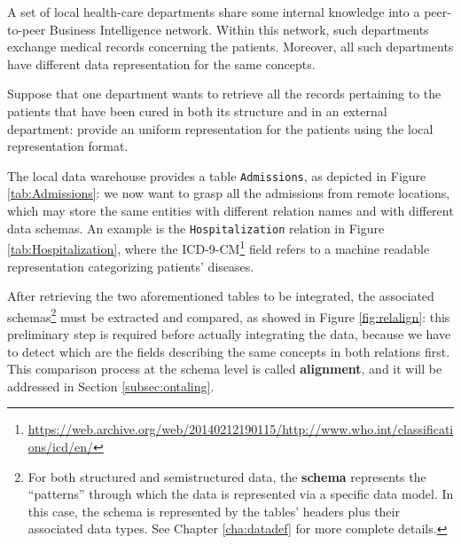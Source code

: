 \begin{example}[label=ex:firstThesis]
A  set of local health-care departments share some internal knowledge into a peer-to-peer Business Intelligence network. Within this network, such departments exchange medical records concerning the patients. Moreover, all such departments have different data representation for the same concepts.

Suppose that one department wants to retrieve all the records pertaining to the patients that have been cured in both its structure and in an external department: provide an uniform representation for the patients using the local representation format.

The local data warehouse provides a table \texttt{Admissions}, as depicted in Figure \ref{tab:Admissions}: we now want to grasp all the admissions from remote locations, which may store the same entities with different relation names and with different data schemas. An example is the \texttt{Hospitalization} relation in Figure \ref{tab:Hospitalization}, where the ICD-9-CM\footnote{\url{https://web.archive.org/web/20140212190115/http://www.who.int/classifications/icd/en/}} field refers to a machine readable representation categorizing patients' diseases.
\end{example}



After retrieving the two aforementioned tables to be integrated, the associated schemas\footnote{For both structured and semistructured data, the \textbf{schema} represents the ``patterns'' through which the data is represented via a specific data model. In this case, the schema is represented by the tables' headers plus their associated data types. See Chapter \ref{cha:datadef} for more complete details.} must be extracted and compared, as showed in Figure  \ref{fig:relalign}: this preliminary step is required before actually integrating the data, because we have to detect which are the fields describing the same concepts in both relations first. This comparison process at the schema level is called \textbf{alignment}, and it will be addressed in Section \vref{subsec:ontaling}.


